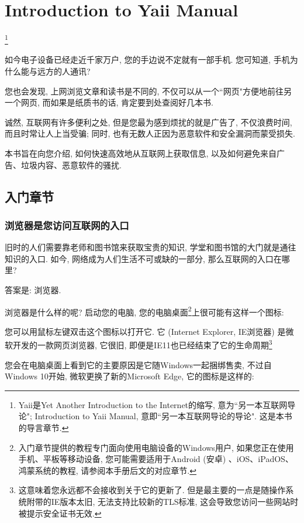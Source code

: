 \chapter{Introduction to Yaii Manual}
\footnote{Yaii是Yet Another Introduction to the Internet的缩写, 意为``另一本互联网导论"; Introduction to Yaii Manual, 意即``另一本互联网导论的导论". 这是本书的导言章节.}

如今电子设备已经走近千家万户, 您的手边说不定就有一部手机. 您可知道, 手机为什么能与远方的人通讯?

您也会发现, 上网浏览文章和读书是不同的, 不仅可以从一个``网页"方便地前往另一个网页, 而如果是纸质书的话, 肯定要到处查阅好几本书.

诚然, 互联网有许多便利之处, 但是您最为感到烦扰的就是广告了, 不仅浪费时间, 而且时常让人上当受骗; 同时, 也有无数人正因为恶意软件和安全漏洞而蒙受损失.

本书旨在向您介绍, 如何快速高效地从互联网上获取信息, 以及如何避免来自广告、垃圾内容、恶意软件的骚扰. 

\section{入门章节}

\subsection{浏览器是您访问互联网的入口}

旧时的人们需要靠老师和图书馆来获取宝贵的知识, 学堂和图书馆的大门就是通往知识的入口. 如今, 网络成为人们生活不可或缺的一部分, 那么互联网的入口在哪里?

答案是: 浏览器.

浏览器是什么样的呢? 启动您的电脑, 您的电脑桌面\footnote{入门章节提供的教程专门面向使用电脑设备的Windows用户, 如果您正在使用手机、平板等移动设备, 您可能需要适用于Android (安卓) 、iOS、iPadOS、鸿蒙系统的教程, 请参阅本手册后文的对应章节. }上很可能有这样一个图标: 

\cite{IE}

您可以用鼠标左键双击这个图标以打开它. 它 (Internet Explorer, IE浏览器) 是微软开发的一款网页浏览器, 它很旧, 即便是IE11也已经结束了它的生命周期\footnote{这意味着您永远都不会接收到关于它的更新了. 但是最主要的一点是随操作系统附带的IE版本太旧, 无法支持比较新的TLS标准, 这会导致您访问一些网站时被提示安全证书无效. }

您会在电脑桌面上看到它的主要原因是它随Windows一起捆绑售卖, 不过自Windows 10开始, 微软更换了新的Microsoft Edge, 它的图标是这样的: 
\cite{MSEdge}

